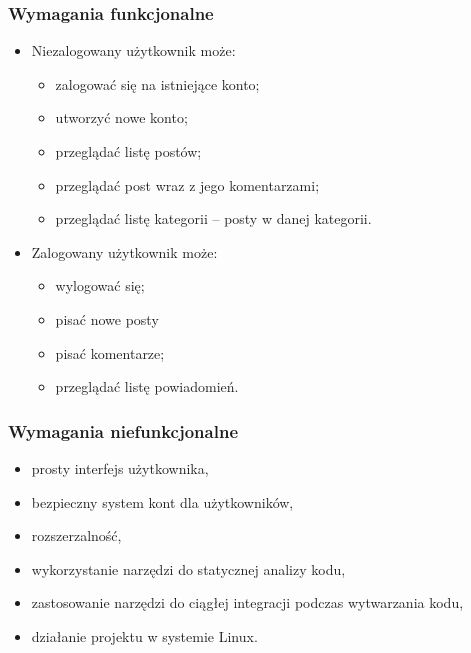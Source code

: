 \documentclass[declaration,shortabstract,polish,inz]{iithesis}
\begin{document}
\subsubsection{Wymagania funkcjonalne}

\begin{itemize}
    \item Niezalogowany użytkownik może: 
    \begin{itemize}
         \item zalogować się na istniejące konto;
         \item utworzyć nowe konto;
         \item przeglądać listę postów;
         \item przeglądać post wraz z jego komentarzami;
         \item przeglądać listę kategorii – posty w danej kategorii.
    \end{itemize}
    \item Zalogowany użytkownik może:
        \begin{itemize}
            \item wylogować się;
            \item pisać nowe posty
            \item pisać komentarze;
            \item przeglądać listę powiadomień.
        \end{itemize}
\end{itemize}

\subsubsection{Wymagania niefunkcjonalne}
\begin{itemize}
    \item prosty interfejs użytkownika,
    \item bezpieczny system kont dla użytkowników,
    \item rozszerzalność,
    \item wykorzystanie narzędzi do statycznej analizy kodu,
    \item zastosowanie narzędzi do ciągłej integracji podczas wytwarzania kodu,
    \item działanie projektu w systemie Linux.
    
\end{itemize}

\end{document}
